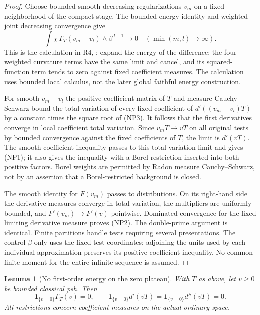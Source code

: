 \documentclass[11pt,a4paper]{article}
\numberwithin{equation}{section}
\newtheorem{lemma}[theorem]{Lemma}
\theoremstyle{definition}
\theoremstyle{remark}
\begin{document}
\begin{proof}
Choose bounded smooth decreasing regularizations $v_m$ on a fixed
neighborhood of the compact stage.  The bounded energy identity and
weighted joint decreasing convergence give
\[
 \int\chi\,\Gamma_T(v_m-v_l)\wedge\beta^{d-1}\longrightarrow0
                    \quad(\min(m,l)\longrightarrow\infty).
 \tag{NP3}
\]
This is the calculation in R4,
: expand the energy of the
difference; the four weighted curvature terms have the same limit
and cancel, and its squared-function term tends to zero against fixed
coefficient measures.  The calculation uses bounded local calculus,
not the later global faithful energy construction.

For smooth $v_m-v_l$ the positive coefficient matrix of $T$ and
measure Cauchy--Schwarz bound the total variation of every fixed
coefficient of $d'((v_m-v_l)T)$ by a constant times the square root
of (NP3).  It follows that the first derivatives converge in local
coefficient total variation.  Since $v_mT\to vT$ on all original
tests by bounded convergence against the fixed coefficients of $T$,
the limit is $d'(vT)$.  The smooth coefficient inequality passes to
this total-variation limit and gives (NP1); it also gives the inequality
with a Borel restriction inserted into both positive factors.  Borel
weights are permitted by Radon measure Cauchy--Schwarz, not by an
assertion that a Borel-restricted background is closed.

The smooth identity for $F(v_m)$ passes to distributions.  On its
right-hand side the derivative measures converge in total variation,
the multipliers are uniformly bounded, and $F'(v_m)\to F'(v)$
pointwise.  Dominated convergence for the fixed limiting derivative
measure proves (NP2).  The double-prime argument is identical.
Finite partitions handle tests requiring several presentations.
The control $\beta$ only uses the fixed test coordinates; adjoining
the units used by each individual approximation preserves its positive
coefficient inequality.  No common finite moment for the entire
infinite sequence is assumed.
\end{proof}

\begin{lemma}[No first-order energy on the zero plateau]
\label{lem:r11-zero-plateau}
With $T$ as above, let $v\geq0$ be bounded classical psh.  Then
\[
 \mathbf1_{\{v=0\}}\Gamma_T(v)=0,\qquad
 \mathbf1_{\{v=0\}}d'(vT)=
 \mathbf1_{\{v=0\}}d''(vT)=0.
 \tag{NP4}
\]
All restrictions concern coefficient measures on the actual ordinary
space.
\end{lemma}
\end{document}
